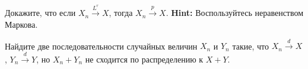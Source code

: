 \documentclass[12pt, a4paper, oneside]{article}
\begin{document}








\begin{problem}{}
Докажите, что если $X_n \overset{L^r}{\to} X$, тогда $X_n \overset{p}{\to} X$. \textbf{Hint:} Воспользуйтесь неравенством Маркова. 
\end{problem} 




\begin{problem}{}
Найдите две последовательности случайных величин $X_n$ и $Y_n$ такие, что $X_n \overset{d}{\to} X$, $Y_n \overset{d}{\to} Y$, но $X_n + Y_n$ не сходится по распределению к $X + Y$.
\end{problem} 

\end{document}

